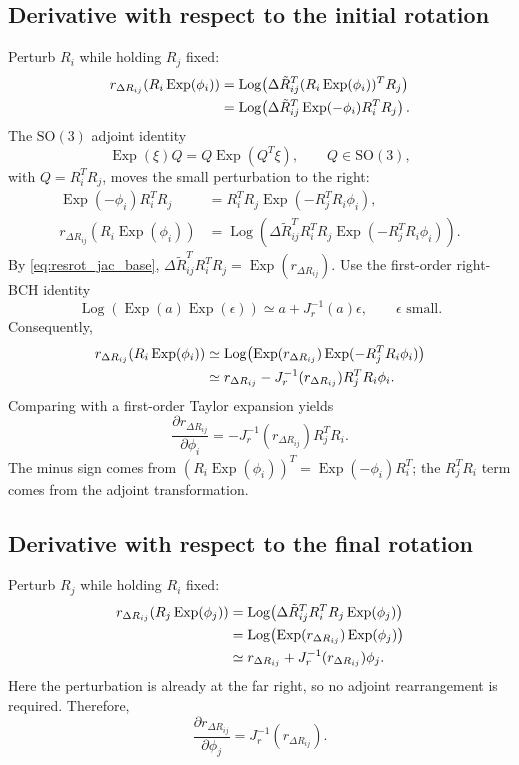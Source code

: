 \documentclass[11pt,a4paper]{article}
\newcommand{\Exp}{\operatorname{Exp}}
\newcommand{\Log}{\operatorname{Log}}
\newcommand{\SO}{\mathrm{SO}}
\begin{document}
\subsection{Derivative with respect to the initial rotation}
Perturb $R_i$ while holding $R_j$ fixed:
\begin{align}
r_{\Delta R_{ij}}(R_i\Exp(\phi_i))
&=\Log\!\left(\Delta\tilde R_{ij}^{T}
 (R_i\Exp(\phi_i))^TR_j\right)\notag\\
&=\Log\!\left(\Delta\tilde R_{ij}^{T}
 \Exp(-\phi_i)R_i^TR_j\right).
\end{align}
The $\SO(3)$ adjoint identity
\begin{equation}
\Exp(\xi)Q=Q\Exp(Q^T\xi),\qquad Q\in\SO(3),
\end{equation}
with $Q=R_i^TR_j$, moves the small perturbation to the right:
\begin{align}
\Exp(-\phi_i)R_i^TR_j
&=R_i^TR_j\Exp(-R_j^TR_i\phi_i),\\
r_{\Delta R_{ij}}(R_i\Exp(\phi_i))
&=\Log\!\left(\Delta\tilde R_{ij}^{T}R_i^TR_j
 \Exp(-R_j^TR_i\phi_i)\right).
\end{align}
By \eqref{eq:resrot_jac_base},
$\Delta\tilde R_{ij}^{T}R_i^TR_j=\Exp(r_{\Delta R_{ij}})$.
Use the first-order right-BCH identity
\begin{equation}\label{eq:right_bch_residual}
\Log\!\left(\Exp(a)\Exp(\epsilon)\right)
\simeq a+J_r^{-1}(a)\epsilon,
\qquad \epsilon\text{ small}.
\end{equation}
Consequently,
\begin{align}
r_{\Delta R_{ij}}(R_i\Exp(\phi_i))
&\simeq\Log\!\left(\Exp(r_{\Delta R_{ij}})
 \Exp(-R_j^TR_i\phi_i)\right)\notag\\
&\simeq r_{\Delta R_{ij}}
 -J_r^{-1}(r_{\Delta R_{ij}})R_j^TR_i\phi_i.
\end{align}
Comparing with a first-order Taylor expansion yields
\begin{equation}\label{eq:JresRi}
\boxed{\frac{\partial r_{\Delta R_{ij}}}{\partial\phi_i}
=-J_r^{-1}(r_{\Delta R_{ij}})R_j^TR_i.}
\end{equation}
The minus sign comes from
$(R_i\Exp(\phi_i))^T=\Exp(-\phi_i)R_i^T$;
the $R_j^TR_i$ term comes from the adjoint transformation.

\subsection{Derivative with respect to the final rotation}
Perturb $R_j$ while holding $R_i$ fixed:
\begin{align}
r_{\Delta R_{ij}}(R_j\Exp(\phi_j))
&=\Log\!\left(\Delta\tilde R_{ij}^{T}R_i^T
 R_j\Exp(\phi_j)\right)\notag\\
&=\Log\!\left(\Exp(r_{\Delta R_{ij}})
 \Exp(\phi_j)\right)\notag\\
&\simeq r_{\Delta R_{ij}}+J_r^{-1}(r_{\Delta R_{ij}})\phi_j.
\end{align}
Here the perturbation is already at the far right, so no adjoint
rearrangement is required. Therefore,
\begin{equation}\label{eq:JresRj}
\boxed{\frac{\partial r_{\Delta R_{ij}}}{\partial\phi_j}
=J_r^{-1}(r_{\Delta R_{ij}}).}
\end{equation}
\end{document}
